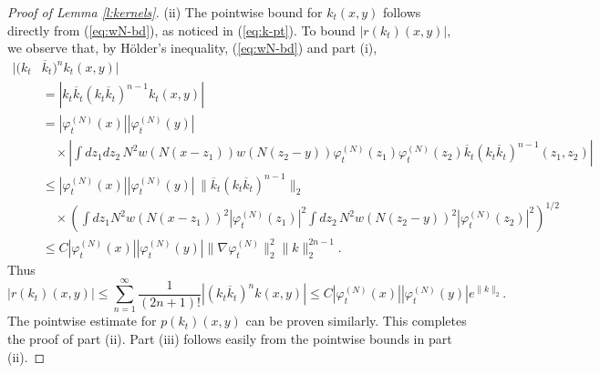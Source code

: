 \documentclass[11pt,a4paper]{article}
\newcommand{\ph}{\varphi_t^{(N)}}	%
\begin{document}
\begin{proof}[Proof of Lemma \ref{l:kernels}]
(ii) The pointwise bound for $k_t(x,y)$ follows directly from (\ref{eq:wN-bd}), as noticed in (\ref{eq:k-pt}). To bound $\lvert r (k_t) (x,y)\rvert$, we observe that, by H\"older's inequality, (\ref{eq:wN-bd}) and part (i),
  \begin{align*}
    |( k_t &\overline{k}_t)^n k_t(x,y)| \\ & = | k_t \overline{k}_t ( k_t \overline{k}_t)^{n-1}
    k_t (x,y)| \\
    & = |\ph(x)| |\ph(y)| \\
& \quad \times \left| \int dz_1 dz_2 \, N^2 w(N(x-z_1))
    w(N(z_2-y)) \ph(z_1) \ph(z_2) \overline{k}_t (k_t
    \overline{k}_t)^{n-1}(z_1,z_2) \right| \\
    & \le |\ph(x)| |\ph(y)| \, \| \overline{k}_t (k_t \overline{k}_t)^{n-1}
    \|_{2} \\
    & \quad \times \left( \int dz_1 N^2 w(N(x-z_1))^2 |\ph(z_1)|^2 \int
    dz_2 \, N^2 w(N(z_2-y))^2 |\ph(z_2)|^2 \right)^{1/2} \\
    & \le C |\ph(x)| |\ph(y)|  \| \nabla \ph \|_{2}^2 \| k
    \|_{2}^{2n-1}.
  \end{align*}
  Thus
  \[
    |r(k_t) (x,y)| \le \sum_{n=1}^\infty \frac{1}{(2n+1)!} |( k_t \overline{k}_t)^n k
    (x,y)|\le C |\ph(x)| |\ph(y)| e^{\| k \|_2}.
  \]
  The pointwise estimate for $p (k_t) (x,y)$ can be proven similarly. 
  This completes the proof of part (ii). Part (iii) follows easily from the pointwise bounds in part (ii).
\end{proof}
\end{document}
